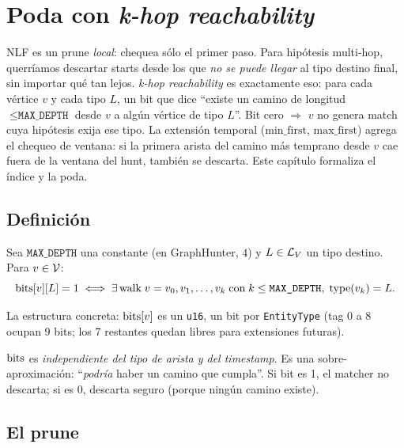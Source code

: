 \chapter{Poda con \emph{k-hop reachability}}
\label{cap:prune-khop}

\begin{intuicion}
NLF es un prune \emph{local}: chequea sólo el primer paso. Para
hipótesis multi-hop, querríamos descartar starts desde los que
\emph{no se puede llegar} al tipo destino final, sin importar qué
tan lejos. \emph{k-hop reachability} es exactamente eso: para cada
vértice \(v\) y cada tipo \(L\), un bit que dice ``existe un camino
de longitud \(\leq \texttt{MAX\_DEPTH}\) desde \(v\) a algún
vértice de tipo \(L\)''. Bit cero $\Rightarrow$ \(v\) no genera
match cuya hipótesis exija ese tipo. La extensión temporal
(\(\mathrm{min\_first}\), \(\mathrm{max\_first}\)) agrega el
chequeo de ventana: si la primera arista del camino más temprano
desde \(v\) cae fuera de la ventana del hunt, también se descarta.
Este capítulo formaliza el índice y la poda.
\end{intuicion}

\section{Definición}

\begin{definition}
Sea \(\texttt{MAX\_DEPTH}\) una constante (en GraphHunter, \(4\)) y
\(L \in \mathcal{L}_V\) un tipo destino. Para \(v \in \mathcal{V}\):
\[
\mathrm{bits}[v][L] = 1 \iff \exists\,\text{walk}\;v = v_0, v_1, \dots, v_k\;
\text{con}\;k \leq \texttt{MAX\_DEPTH},\;\mathrm{type}(v_k) = L.
\]
\end{definition}

\noindent
La estructura concreta: \(\mathrm{bits}[v]\) es un \texttt{u16}, un bit por
\texttt{EntityType} (tag 0 a 8 ocupan 9 bits; los 7 restantes
quedan libres para extensiones futuras).

\begin{nota}
\(\mathrm{bits}\) es \emph{independiente del tipo de arista y del
timestamp}. Es una sobre-aproximación: ``\emph{podría} haber un
camino que cumpla''. Si bit es 1, el matcher no descarta; si es 0,
descarta seguro (porque ningún camino existe).
\end{nota}

\section{El prune}

